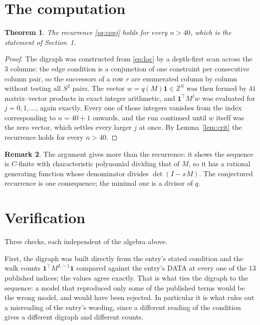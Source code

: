 \documentclass[11pt,a4paper]{article}
\theoremstyle{plain}
\newtheorem{theorem}{Theorem}
\theoremstyle{definition}
\newtheorem{remark}[theorem]{Remark}
\begin{document}
\section{The computation}

\begin{theorem}
The recurrence \eqref{eq:conj} holds for every $n>40$, which is the statement of
Section~1.
\end{theorem}

\begin{proof}
The digraph was constructed from \eqref{eq:loc} by a depth-first scan across the $3$
columns: the edge condition is a conjunction of one constraint per consecutive column
pair, so the successors of a row $r$ are enumerated column by column without testing all
$S^2$ pairs. The vector $w=q(M)\mathbf{1}\in\mathbb{Z}^{S}$ was then formed by $41$
matrix--vector products in exact integer arithmetic, and $\mathbf{1}^{\!\top}M^{j}w$ was
evaluated for $j=0,1,\dots$, again exactly. Every one of those integers vanishes from the
index corresponding to $n=40+1$ onwards, and the run continued until $w$ itself was the
zero vector, which settles every larger $j$ at once. By Lemma~\ref{lem:crit} the recurrence
holds for every $n>40$.
\end{proof}

\begin{remark}
The argument gives more than the recurrence: it shows the sequence is $C$-finite with
characteristic polynomial dividing that of $M$, so it has a rational generating function
whose denominator divides $\det(I-xM)$. The conjectured recurrence is one consequence; the
minimal one is a divisor of $q$.
\end{remark}

\section{Verification}

Three checks, each independent of the algebra above.

First, the digraph was built directly from the entry's stated condition and the walk counts
$\mathbf{1}^{\!\top}M^{L-1}\mathbf{1}$ compared against the entry's DATA at
every one of the $13$ published indices; the values agree exactly. That is what ties
the digraph to the sequence: a model that reproduced only some of the published terms would
be the wrong model, and would have been rejected. In particular it is what rules out a
misreading of the entry's wording, since a different reading of the condition gives a
different digraph and different counts.
\end{document}
